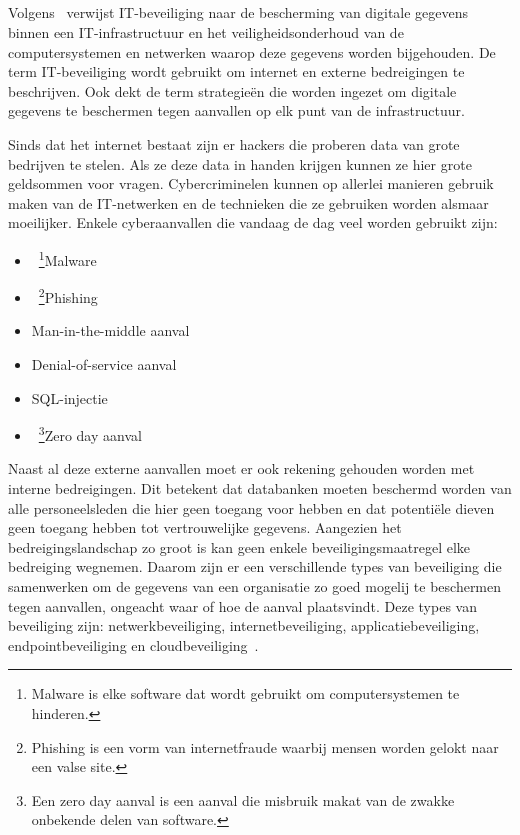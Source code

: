 \subsection{}
\label{subsec:IT security}
\subsubsection{}
\label{subsec:Wat valt er onder IT security?}
Volgens~\textcite{Kieron2020} verwijst IT-beveiliging naar de bescherming van digitale gegevens binnen een IT-infrastructuur en het veiligheidsonderhoud van de computersystemen en netwerken waarop deze gegevens worden bijgehouden. De term IT-beveiliging wordt gebruikt om internet en externe bedreigingen te beschrijven. Ook dekt de term strategieën die worden ingezet om digitale gegevens te beschermen tegen aanvallen op elk punt van de infrastructuur. 

Sinds dat het internet bestaat zijn er hackers die proberen data van grote bedrijven te stelen. Als ze deze data in handen krijgen kunnen ze hier grote geldsommen voor vragen. Cybercriminelen kunnen op allerlei manieren gebruik maken van de IT-netwerken en de technieken die ze gebruiken worden alsmaar moeilijker. Enkele cyberaanvallen die vandaag de dag veel worden gebruikt zijn:
\begin{itemize}
    \item ~\footnote{Malware is elke software dat wordt gebruikt om computersystemen te hinderen.}Malware
    \item ~\footnote{Phishing is een vorm van internetfraude waarbij mensen worden gelokt naar een valse site.}Phishing
    \item Man-in-the-middle aanval
    \item Denial-of-service aanval
    \item SQL-injectie
    \item ~\footnote{Een zero day aanval is een aanval die misbruik makat van de zwakke onbekende delen van software.}Zero day aanval
\end{itemize}
Naast al deze externe aanvallen moet er ook rekening gehouden worden met interne bedreigingen. Dit betekent dat databanken moeten beschermd worden van alle personeelsleden die hier geen toegang voor hebben en dat potentiële dieven geen toegang hebben tot vertrouwelijke gegevens. Aangezien het bedreigingslandschap zo groot is kan geen enkele beveiligingsmaatregel elke bedreiging wegnemen. Daarom zijn er een verschillende types van beveiliging die samenwerken om de gegevens van een organisatie zo goed mogelij te beschermen tegen aanvallen, ongeacht waar of hoe de aanval plaatsvindt. Deze types van beveiliging zijn: netwerkbeveiliging, internetbeveiliging, applicatiebeveiliging, endpointbeveiliging en cloudbeveiliging~\autocite{Kieron2020}. 

